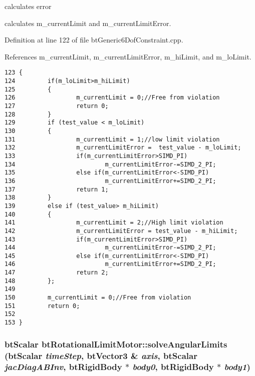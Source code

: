 calculates error 

calculates m\_\-currentLimit and m\_\-currentLimitError. 

Definition at line 122 of file btGeneric6DofConstraint.cpp.

References m\_\-currentLimit, m\_\-currentLimitError, m\_\-hiLimit, and m\_\-loLimit.

\begin{Code}\begin{verbatim}123 {
124         if(m_loLimit>m_hiLimit)
125         {
126                 m_currentLimit = 0;//Free from violation
127                 return 0;
128         }
129         if (test_value < m_loLimit)
130         {
131                 m_currentLimit = 1;//low limit violation
132                 m_currentLimitError =  test_value - m_loLimit;
133                 if(m_currentLimitError>SIMD_PI) 
134                         m_currentLimitError-=SIMD_2_PI;
135                 else if(m_currentLimitError<-SIMD_PI) 
136                         m_currentLimitError+=SIMD_2_PI;
137                 return 1;
138         }
139         else if (test_value> m_hiLimit)
140         {
141                 m_currentLimit = 2;//High limit violation
142                 m_currentLimitError = test_value - m_hiLimit;
143                 if(m_currentLimitError>SIMD_PI) 
144                         m_currentLimitError-=SIMD_2_PI;
145                 else if(m_currentLimitError<-SIMD_PI) 
146                         m_currentLimitError+=SIMD_2_PI;
147                 return 2;
148         };
149 
150         m_currentLimit = 0;//Free from violation
151         return 0;
152 
153 }
\end{verbatim}
\end{Code}


\hypertarget{classbt_rotational_limit_motor_d52e9b1c402c7bdd47fb1a9de28afb7e}{
\subsubsection[solveAngularLimits]{\setlength{\rightskip}{0pt plus 5cm}btScalar btRotationalLimitMotor::solveAngularLimits (btScalar {\em timeStep}, \/  btVector3 \& {\em axis}, \/  btScalar {\em jacDiagABInv}, \/  {\bf btRigidBody} $\ast$ {\em body0}, \/  {\bf btRigidBody} $\ast$ {\em body1})}}
\label{classbt_rotational_limit_motor_d52e9b1c402c7bdd47fb1a9de28afb7e}


